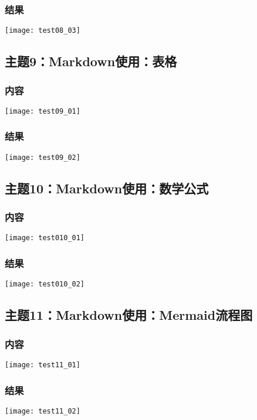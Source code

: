 \documentclass{article}
\begin{document}
\subsubsection{结果}  
\texttt{[image: test08\_03]}\\
\vspace{1cm}
\subsection{主题9：Markdown使用：表格}  
\subsubsection{内容}
\texttt{[image: test09\_01]}\\  
\subsubsection{结果}  
\texttt{[image: test09\_02]}\\  
\vspace{1cm}
\subsection{主题10：Markdown使用：数学公式}  
\subsubsection{内容}
\texttt{[image: test010\_01]}\\  
\subsubsection{结果}  
\texttt{[image: test010\_02]}\\  
\vspace{1cm}
\subsection{主题11：Markdown使用：Mermaid流程图}  
\subsubsection{内容}
\texttt{[image: test11\_01]}\\  
\subsubsection{结果}  
\texttt{[image: test11\_02]}\\  
\vspace{1cm}
\end{document}
